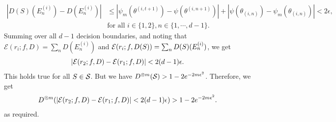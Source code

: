 \begin{apdxproof}
    \begin{equation}\label{lem:eqn:actual dominate emp}
        \begin{aligned}
            |D(S)(E_n^{(i)}) - D(E_n^{(i)})| &\leq |\psi_m(\theta^{(i,t+1)}) - \psi(\theta^{(i,n+1)})| + |\psi(\theta_{(i,n)}) - \psi_m(\theta_{(i,n)})| < 2\epsilon,\\
            &\text{for all }i \in \{1, 2\}, n \in \{1,\cdots,d-1\}.
        \end{aligned}
    \end{equation}
    Summing over all $d-1$ decision boundaries, and noting that $\mathcal{E}(r_i;f, D) = \sum_n D(E_n^{(i)})$ and $\mathcal{E}(r_i;f, D(S)) = \sum_n D(S)(E_n^{(i)})$, we get
    \[
        |\mathcal{E}(r_2;f, D) - \mathcal{E}(r_1;f, D)| < 2(d-1)\epsilon.
    \]
This holds true for all $S \in \mathcal{S}$. But we have $D^{\otimes m}(\mathcal{S}) > 1-2e^{-2m\epsilon^2}$. Therefore, we get
\[
       D^{\otimes m}(|\mathcal{E}(r_2;f, D) - \mathcal{E}(r_1;f, D)| < 2(d-1)\epsilon) > 1- 2e^{-2m\epsilon^2}.
    \]
as required.

\end{apdxproof}





